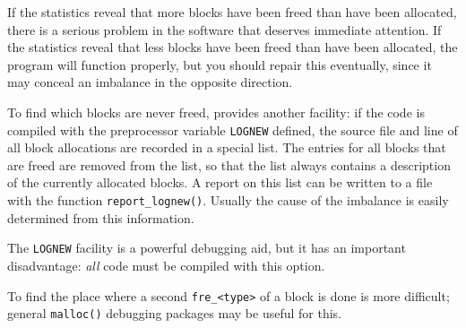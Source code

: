 \par
If the statistics reveal that more blocks have been freed than have
been allocated, there is a serious problem in the software that deserves
immediate attention.
If the statistics reveal that less blocks have been freed than have been
allocated,
the program will function properly, but you should repair this
eventually, since it may conceal an imbalance in the opposite direction.
\par
To find which blocks are never freed,
{\Tm} provides another facility:
if the code is compiled with the {\C} preprocessor variable
{\tt LOGNEW} defined,
the source file and line of all {\Tm} block allocations are recorded in a
special list.
The entries for all blocks that are freed are removed from the list,
so that the list always contains a description of the currently allocated
blocks.
A report on this list can be written to a file with the function
\verb+report_lognew()+.
Usually the cause of the imbalance is easily determined from this information.
\par
The {\tt LOGNEW} facility is a powerful debugging aid, but it has an important
disadvantage:
{\em all} code must be compiled with this option.
\par
To find the place where a second \verb+fre_<type>+ of a block is done is
more difficult;
general \verb+malloc()+ debugging packages may be useful for this.
